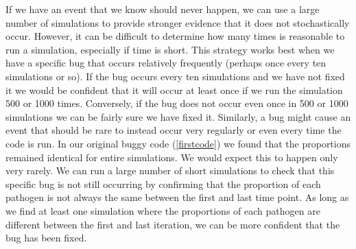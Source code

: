 \documentclass[]{elsarticle} %
\begin{document}
If we have an event that we know should never happen, we can use a large number of simulations to provide stronger evidence that it does not stochastically occur.
However, it can be difficult to determine how many times is reasonable to run a simulation, especially if time is short.
This strategy works best when we have a specific bug that occurs relatively frequently (perhaps once every ten simulations or so).
If the bug occurs every ten simulations and we have not fixed it we would be confident that it will occur at least once if we run the simulation 500 or 1000 times.
Conversely, if the bug does not occur even once in 500 or 1000 simulations we can be fairly sure we have fixed it.
\newline
\newline
Similarly, a bug might cause an event that should be rare to instead occur very regularly or even every time the code is run.
In our original buggy code (\ref{firstcode}) we found that the proportions remained identical for entire simulations.
We would expect this to happen only very rarely.
We can run a large number of short simulations to check that this specific bug is not still occurring by confirming that the proportion of each pathogen is not always the same between the first and last time point.
As long as we find at least one simulation where the proportions of each pathogen are different between the first and last iteration, we can be more confident that the bug has been fixed.
\newline
{}\label{returningpathogen}
\end{document}
